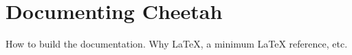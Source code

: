 \section{Documenting Cheetah}
\label{documenting}

How to build the documentation.  Why LaTeX, a minimum LaTeX reference, etc.


